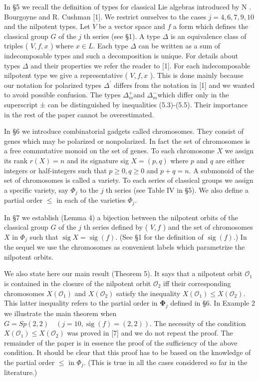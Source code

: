 \documentclass[10pt]{article}
\begin{document}
In §5 we recall the definition of types for classical Lie algebras introduced by N . Bourgoyne and R. Cushman [1]. We restrict ourselves to the cases $j=4,6,7,9,10$ and the nilpotent types. Let $V$ be a vector space and $f$ a form which defines the classical group $G$ of the $j$ th series (see §1). A type $\Delta$ is an equivalence class of triples ( $V, f, x$ ) where $x \in L$. Each type $\Delta$ can be written as a sum of indecomposable types and such a decomposition is unique. For details about types $\Delta$ and their properties we refer the reader to [1]. For each indecomposable nilpotent type we give a representative ( $V, f, x$ ). This is done mainly because our notation for polarized types $\Delta^{\prime}$ differs from the notation in [1] and we wanted to avoid possible confusion. The types $\Delta_{m}^{+}$and $\Delta_{m}^{-}$which differ only in the superscript ± can be distinguished by inequalities (5.3)-(5.5). Their importance in the rest of the paper cannot be overestimated.

In §6 we introduce combinatorial gadgets called chromosomes. They consist of genes which may be polarized or nonpolarized. In fact the set of chromosomes is a free commutative monoid on the set of genes. To each chromosome $X$ we assign its rank $r(X)=n$ and its signature sig $X=(p, q)$ where $p$ and $q$ are either integers or half-integers such that $p \geqslant 0, q \geqslant 0$ and $p+q=n$. A submonoid of the set of chromosomes is called a variety. To each series of classical groups we assign a specific variety, say $\Phi_{j}$ to the $j$ th series (see Table IV in §5). We also define a partial order $\leqslant$ in each of the varieties $\Phi_{j}$.

In §7 we establish (Lemma 4) a bijection between the nilpotent orbits of the classical group $G$ of the $j$ th series defined by ( $V, f$ ) and the set of chromosomes $X$ in $\Phi_{j}$ such that $\operatorname{sig} X=\operatorname{sig}(f)$. (See §1 for the definition of $\operatorname{sig}(f)$.) In the sequel we use the chromosomes as convenient labels which parametrize the nilpotent orbits.

We also state here our main result (Theorem 5). It says that a nilpotent orbit $\mathcal{O}_{1}$ is contained in the closure of the nilpotent orbit $\mathcal{O}_{2}$ iff their corresponding chromosomes $X\left(\mathcal{O}_{1}\right)$ and $X\left(\mathcal{O}_{2}\right)$ satisfy the inequality $X\left(\mathcal{O}_{1}\right) \leqslant X\left(\mathcal{O}_{2}\right)$. This latter inequality refers to the partial order in $\boldsymbol{\Phi}_{j}$ defined in §6. In Example 2 we illustrate the main theorem when $G=S p(2,2) \quad(j=10, \operatorname{sig}(f)=(2,2))$. The necessity of the condition $X\left(\mathcal{O}_{1}\right) \leqslant X\left(\mathcal{O}_{2}\right)$ was proved in [7] and we do not repeat the proof. The remainder of the paper is in essence the proof of the sufficiency of the above condition. It should be clear that this proof has to be based on the knowledge of the partial order $\leqslant$ in $\Phi_{j}$. (This is true in all the cases considered so far in the literature.)
\end{document}
